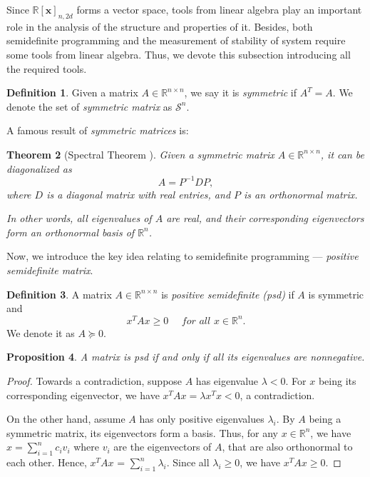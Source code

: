 \documentclass[12pt]{amsart}
\numberwithin{equation}{section}
\newtheorem{thm}{Theorem}
\newtheorem{prop}[thm]{Proposition}
\theoremstyle{definition}
\newtheorem{definition}[thm]{Definition}
\numberwithin{thm}{section}
\begin{document}
Since $\mathbb{R}[\mathbf{x}]_{n, 2d}$ forms a vector space, tools from linear algebra play an important role in the analysis of the structure and properties of it. 
Besides, both semidefinite programming and the measurement of stability of system require some tools from linear algebra. 
Thus, we devote this subsection introducing all the required tools. 

\begin{definition}
     Given a matrix $A \in \mathbb{R}^{n \times n}$, we say it is \emph{symmetric} if $A^T = A$. We denote the set of \emph{symmetric matrix} as $\mathcal{S}^n$.  
\end{definition}

A famous result of \emph{symmetric matrices} is:
\begin{thm} [Spectral Theorem \cite{golub1996matrix}]

     Given a symmetric matrix $A \in \mathbb{R}^{n \times n}$, 
     it can be diagonalized as \begin{equation*} A = P^{-1}DP, \end{equation*}
     where $D$ is a diagonal matrix with real entries, and $P$ is an orthonormal matrix.
     
     In other words, all eigenvalues of $A$ are real, and their corresponding eigenvectors form an orthonormal basis of $\mathbb{R}^n$. 
\end{thm} 

\smallskip

Now, we introduce the key idea relating to semidefinite programming --- \emph{positive semidefinite matrix}.

\begin{definition}
     A matrix $A \in \mathbb{R}^{n \times n}$ is \emph{positive semidefinite (psd)} if $A$ is symmetric and \begin{equation*}
          x^T A x \geq 0 \quad \textit{ for all } x \in \mathbb{R}^n.
     \end{equation*}
     We denote it as $A \succcurlyeq 0$.
\end{definition}

\begin{prop}
     A matrix is psd if and only if all its eigenvalues are nonnegative.
\end{prop}

\begin{proof}
     Towards a contradiction, suppose $A$ has eigenvalue $\lambda < 0$.
     For $x$ being its corresponding eigenvector, we have $x^T A x = \lambda x^T x < 0$, a contradiction.
     
     On the other hand, assume $A$ has only positive eigenvalues $\lambda_i$. 
     By $A$ being a symmetric matrix, 
     its eigenvectors form a basis. 
     Thus, for any $x \in \mathbb{R}^n$, we have
     $x = \sum_{i = 1} ^ n c_i v_i $ where $v_i$ are the eigenvectors of $A$, that are also orthonormal to each other.
     Hence, $x^T A x$ = $\sum_{i = 1} ^ n \lambda_i$. Since all $\lambda_i \geq 0$, we have $x ^ T A x \geq 0$.
\end{proof}
\end{document}
